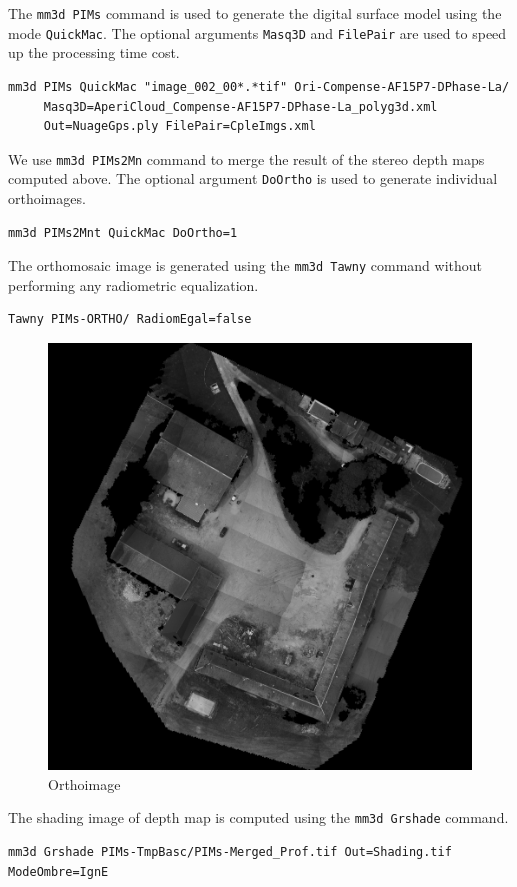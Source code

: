 The {\tt mm3d PIMs} command is used to generate the digital surface model using the mode {\tt QuickMac}. The optional arguments {\tt Masq3D} and {\tt FilePair} are used to speed up the processing time cost.
\begin{verbatim}
mm3d PIMs QuickMac "image_002_00*.*tif" Ori-Compense-AF15P7-DPhase-La/ 
     Masq3D=AperiCloud_Compense-AF15P7-DPhase-La_polyg3d.xml 
     Out=NuageGps.ply FilePair=CpleImgs.xml
\end{verbatim}

We use {\tt mm3d PIMs2Mn} command to merge the result of the stereo depth maps computed above. The optional argument {\tt DoOrtho} is used to generate individual orthoimages.
\begin{verbatim}
mm3d PIMs2Mnt QuickMac DoOrtho=1
\end{verbatim}

The orthomosaic image is generated using the {\tt mm3d Tawny} command without performing any radiometric equalization.
\begin{verbatim}
Tawny PIMs-ORTHO/ RadiomEgal=false
\end{verbatim}

\begin{figure}[H]
    \begin{center}
    \setlength{\unitlength}{0.5cm}
    \includegraphics[width=0.4\linewidth]{FIGS/Viabon/ortho.png}
    \end{center}
    \caption{Orthoimage}
    \label{fig:sel}
\end{figure}

The shading image of depth map is computed using the {\tt mm3d Grshade} command.
\begin{verbatim}
mm3d Grshade PIMs-TmpBasc/PIMs-Merged_Prof.tif Out=Shading.tif ModeOmbre=IgnE
\end{verbatim}

